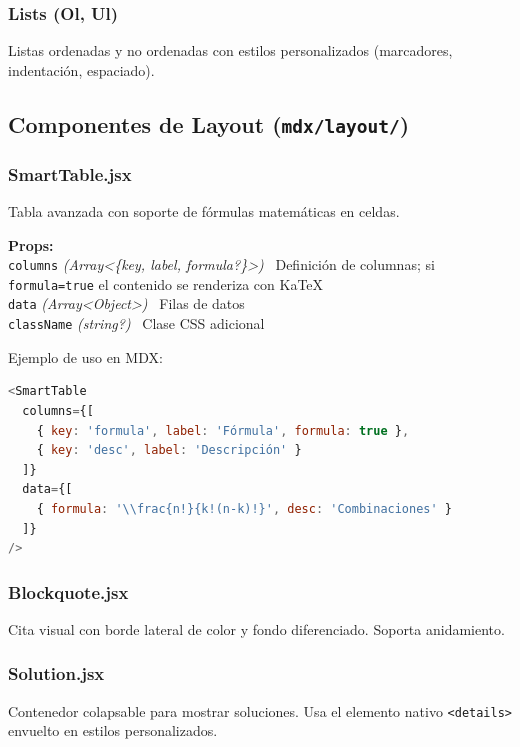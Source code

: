 \documentclass[12pt,a4paper]{article}
\newcommand{\prop}[3]{%
  \texttt{#1} \textit{(#2)} \textemdash\ #3\\%
}
\begin{document}
\subsubsection{Lists (Ol, Ul)}

Listas ordenadas y no ordenadas con estilos personalizados (marcadores, indentación, espaciado).

\subsection{Componentes de Layout (\texttt{mdx/layout/})}

\subsubsection{SmartTable.jsx}

Tabla avanzada con soporte de fórmulas matemáticas en celdas.

\begin{mdframed}[style=propbox]
\textbf{Props:}\\
\prop{columns}{Array\textless\{key, label, formula?\}\textgreater}{Definición de columnas; si \texttt{formula=true} el contenido se renderiza con KaTeX}
\prop{data}{Array\textless Object\textgreater}{Filas de datos}
\prop{className}{string?}{Clase CSS adicional}
\end{mdframed}

Ejemplo de uso en MDX:
\begin{lstlisting}[language=JavaScript]
<SmartTable
  columns={[
    { key: 'formula', label: 'Fórmula', formula: true },
    { key: 'desc', label: 'Descripción' }
  ]}
  data={[
    { formula: '\\frac{n!}{k!(n-k)!}', desc: 'Combinaciones' }
  ]}
/>
\end{lstlisting}

\subsubsection{Blockquote.jsx}

Cita visual con borde lateral de color y fondo diferenciado. Soporta anidamiento.

\subsubsection{Solution.jsx}

Contenedor colapsable para mostrar soluciones. Usa el elemento nativo \texttt{<details>} envuelto en estilos personalizados.
\end{document}
